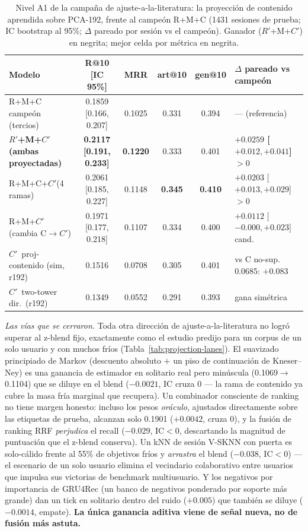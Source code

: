 \documentclass[11pt]{article}
\newcommand{\best}[1]{\textbf{#1}}
\newcommand{\Rp}{\ensuremath{R'}}
\newcommand{\Cp}{\ensuremath{C'}}
\begin{document}
\begin{table}[ht]
  \centering
  \caption{Nivel A1 de la campaña de ajuste-a-la-literatura: la proyección de
  contenido aprendida sobre PCA-192, frente al campeón R+M+C (\num{1431} sesiones
  de prueba; IC bootstrap al 95\%; $\Delta$ pareado por sesión vs el campeón).
  Ganador (\Rp+M+\Cp) en negrita; mejor celda por métrica en negrita.}
  \label{tab:projection}
  {\footnotesize\setlength{\tabcolsep}{4pt}\begin{tabular}{lccccl}
    \toprule
    Modelo & R@10 [IC 95\%] & MRR & art@10 & gen@10 & $\Delta$ pareado vs campeón \\
    \midrule
    R+M+C campeón (tercios)           & 0.1859 [0.166, 0.207] & 0.1025 & 0.331 & 0.394 & --- (referencia) \\
    \best{\Rp+M+\Cp (ambas proyectadas)} & \best{0.2117 [0.191, 0.233]} & \best{0.1220} & 0.333 & 0.401 & \best{$+0.0259$ [$+0.012,+0.041$] $>0$} \\
    R+M+C+\Cp (4 ramas)               & 0.2061 [0.185, 0.227] & 0.1148 & \best{0.345} & \best{0.410} & $+0.0203$ [$+0.013,+0.029$] $>0$ \\
    R+M+\Cp (cambia C$\to$\Cp)        & 0.1971 [0.177, 0.218] & 0.1107 & 0.334 & 0.400 & $+0.0112$ [$-0.000,+0.023$] cand. \\
    \Cp\ proj-contenido (sim, r192)   & 0.1516 & 0.0708 & 0.305 & 0.401 & vs C no-sup. 0.0685: $+0.083$ \\
    \Cp\ two-tower dir.\ (r192)       & 0.1349 & 0.0552 & 0.291 & 0.393 & gana simétrica \\
    \bottomrule
  \end{tabular}}
\end{table}

\emph{Las vías que se cerraron.} Toda otra dirección de ajuste-a-la-literatura no
logró superar al z-blend fijo, exactamente como el estudio predijo para un corpus
de un solo usuario y con muchos fríos (Tabla~\ref{tab:projection-lanes}). El
suavizado principiado de Markov (descuento absoluto $+$ un piso de continuación de
Kneser--Ney) es una ganancia de estimador en solitario real pero minúscula
(\num{0.1069}$\to$\num{0.1104}) que se diluye en el blend ($-\num{0.0021}$, IC
cruza 0 --- la rama de contenido ya cubre la masa fría marginal que recupera). Un
combinador consciente de ranking no tiene margen honesto: incluso los pesos
\emph{oráculo}, ajustados directamente sobre las etiquetas de prueba, alcanzan
solo \num{0.1901} ($+\num{0.0042}$, cruza 0), y la fusión de ranking RRF
\emph{perjudica} el recall ($-\num{0.029}$, IC$<$0, descartando la magnitud de
puntuación que el z-blend conserva). Un kNN de sesión V-SKNN con puerta es
solo-cálido frente al 55\% de objetivos fríos y \emph{arrastra} el blend
($-\num{0.038}$, IC$<$0) --- el escenario de un solo usuario elimina el vecindario
colaborativo entre usuarios que impulsa sus victorias de benchmark multiusuario. Y
los negativos por importancia de GRU4Rec (un banco de negativos ponderado por
soporte más grande) dan un tick en solitario dentro del ruido ($+\num{0.005}$) que
también se diluye ($-\num{0.0014}$, empate). \textbf{La única ganancia aditiva
viene de señal nueva, no de fusión más astuta.}
\end{document}
